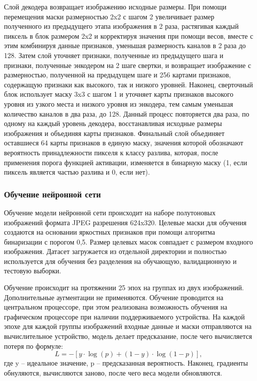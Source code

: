 Слой декодера возвращает изображению исходные размеры. При помощи перемещения маски размерностью 2x2 с шагом 2 увеличивает размер полученного из предыдущего этапа изображения в 2 раза, растягивая каждый пиксель в блок размером 2x2 и корректируя значения при помощи весов, вместе с этим комбинируя данные признаков, уменьшая размерность каналов в 2 раза до 128. Затем слой уточняет признаки, полученные из предыдущего шага и признаки, полученные энкодером на 2 шаге свертки, и возвращает изображение с размерностью, полученной на предыдущем шаге и 256 картами признаков, содержащую признаки как высокого, так и низкого уровней. Наконец, сверточный блок использует маску 3x3 с шагом 1 и уточняет карты признаков высокого уровня из узкого места и низкого уровня из энкодера, тем самым уменьшая количество каналов в два раза, до 128. Данный процесс повторяется два раза, по одному на каждый уровень декодера, восстанавливая исходные размеры изображения и объединяя карты признаков. Финальный слой объединяет оставшиеся 64 карты признаков в единую маску, значения  которой обозначают вероятность принадлежности пикселя к классу разлива, которая, после применения порога функцией активации, изменяется в бинарную маску (1, если пиксель является частью разлива и 0, если нет).

\subsubsection{Обучение нейронной сети}

Обучение модели нейронной сети происходит на наборе полутоновых изображений формата JPEG разрешения 624x320. Целевые маски для обучения создаются на основании яркостных признаков при помощи алгоритма бинаризации с порогом 0,5. Размер целевых масок совпадает с размером входного изображения. Датасет загружается из отдельной директории и полностью используется для обучения без разделения на обучающую, валидационную и тестовую выборки.

Обучение происходит на протяжении 25 эпох на группах из двух изображений. Дополнительные аугментации не применяются. Обучение проводится на центральном процессоре, при этом реализована возможность обучения на графическом процессоре при наличии поддерживаемого устройства. На каждой эпохе для каждой группы изображений входные данные и маски отправляются на вычислительное устройство, модель делает предсказание, после чего вычисляется потеря по формуле:
\[
L = -\left[ y \cdot \log(p) + (1 - y) \cdot \log(1 - p) \right],
\]
где y -- идеальное значение, p -- предсказанная вероятность. Наконец, градиенты обнуляются, вычисляются заново, после чего веса модели обновляются.	

